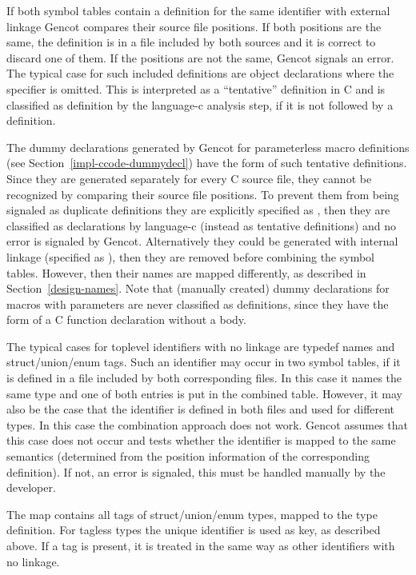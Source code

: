 If both symbol tables contain a definition for the same identifier with external linkage Gencot compares their source 
file positions. If both positions are the same, the definition is in a file included by both sources and it is correct to
discard one of them. If the positions are not the same, Gencot signals an error. The typical case for such included 
definitions are object declarations where the  specifier is omitted. This is interpreted as a ``tentative''
definition in C and is classified as definition by the language-c analysis step, if it is not followed by a definition.

The dummy declarations generated by Gencot for parameterless macro definitions (see Section~\ref{impl-ccode-dummydecl})
have the form of such tentative definitions. Since they are generated separately for every C source file, they cannot
be recognized by comparing their source file positions. To prevent them from being signaled as duplicate definitions they
are explicitly specified as , then they are classified as declarations by language-c (instead as tentative 
definitions) and no error is signaled by Gencot. Alternatively they could be generated with internal linkage (specified 
as ), then they are removed before combining the symbol tables. However, then their names are mapped differently,
as described in Section~\ref{design-names}. Note that (manually created) dummy declarations for
macros with parameters are never classified as definitions, since they have the form of a C function declaration without
a body. 

The typical cases for toplevel identifiers with no linkage are typedef names and struct/union/enum tags. Such an identifier
may occur in two symbol tables, if it is
defined in a file included by both corresponding  files. In this case it names the same type and one of both
entries is put in the combined table. However, it may also be the case that the identifier is defined in both 
files and used for different types. In this case the combination approach does not work. Gencot assumes that this case
does not occur and tests whether the identifier is mapped to the same semantics (determined from the position information
of the corresponding definition). If not, an error is signaled, this must be handled manually by the developer.

The map  contains all tags of struct/union/enum types, mapped to the type definition. For tagless types
the unique identifier is used as key, as described above. If a tag is present, it is treated in the same way as other 
identifiers with no linkage.

